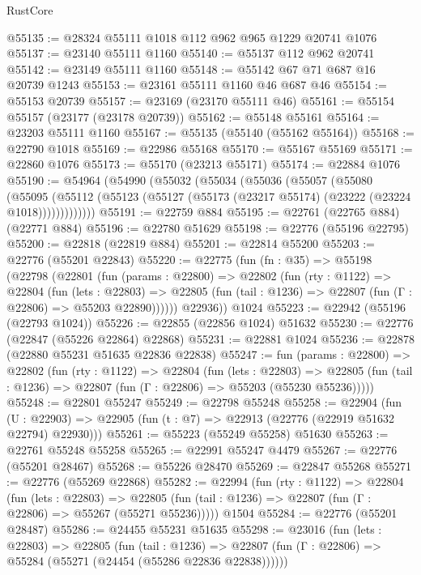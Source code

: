 \begin{lexlean}{RustCore}
\begin{coremodule}
@55135 := @28324 @55111 @1018 @112 @962 @965 @1229 @20741 @1076
@55137 := @23140 @55111 @1160
@55140 := @55137 @112 @962 @20741
@55142 := @23149 @55111 @1160
@55148 := @55142 @67 @71 @687 @16 @20739 @1243
@55153 := @23161 @55111 @1160 @46 @687 @46
@55154 := @55153 @20739
@55157 := @23169 (@23170 @55111 @46)
@55161 := @55154 @55157 (@23177 (@23178 @20739))
@55162 := @55148 @55161
@55164 := @23203 @55111 @1160
@55167 := @55135 (@55140 (@55162 @55164))
@55168 := @22790 @1018
@55169 := @22986 @55168
@55170 := @55167 @55169
@55171 := @22860 @1076
@55173 := @55170 (@23213 @55171)
@55174 := @22884 @1076
@55190 := @54964
    (@54990
      (@55032
        (@55034
          (@55036
            (@55057
              (@55080
                (@55095
                  (@55112 (@55123 (@55127 (@55173 (@23217 @55174) (@23222 (@23224 @1018)))))))))))))
@55191 := @22759 @884
@55195 := @22761 (@22765 @884) (@22771 @884)
@55196 := @22780 @51629
@55198 := @22776 (@55196 @22795)
@55200 := @22818 (@22819 @884)
@55201 := @22814 @55200
@55203 := @22776 (@55201 @22843)
@55220 := @22775
    (fun (fn : @35) =>
    @55198
      (@22798
        (@22801
          (fun (params : @22800) =>
          @22802
            (fun (rty : @1122) =>
            @22804
              (fun (lets : @22803) =>
              @22805 (fun (tail : @1236) => @22807 (fun (Γ : @22806) => @55203 @22890))))))
        @22936))
    @1024
@55223 := @22942 (@55196 (@22793 @1024))
@55226 := @22855 (@22856 @1024) @51632
@55230 := @22776 (@22847 (@55226 @22864) @22868)
@55231 := @22881 @1024
@55236 := @22878 (@22880 @55231 @51635 @22836 @22838)
@55247 := fun (params : @22800) =>
  @22802
    (fun (rty : @1122) =>
    @22804
      (fun (lets : @22803) =>
      @22805 (fun (tail : @1236) => @22807 (fun (Γ : @22806) => @55203 (@55230 @55236)))))
@55248 := @22801 @55247
@55249 := @22798 @55248
@55258 := @22904
    (fun (U : @22903) => @22905 (fun (t : @7) => @22913 (@22776 (@22919 @51632 @22794) @22930)))
@55261 := @55223 (@55249 @55258) @51630
@55263 := @22761 @55248 @55258
@55265 := @22991 @55247 @4479
@55267 := @22776 (@55201 @28467)
@55268 := @55226 @28470
@55269 := @22847 @55268
@55271 := @22776 (@55269 @22868)
@55282 := @22994
    (fun (rty : @1122) =>
    @22804
      (fun (lets : @22803) =>
      @22805 (fun (tail : @1236) => @22807 (fun (Γ : @22806) => @55267 (@55271 @55236)))))
    @1504
@55284 := @22776 (@55201 @28487)
@55286 := @24455 @55231 @51635
@55298 := @23016
    (fun (lets : @22803) =>
    @22805
      (fun (tail : @1236) =>
      @22807 (fun (Γ : @22806) => @55284 (@55271 (@24454 (@55286 @22836 @22838))))))

\end{coremodule}
\end{lexlean}
